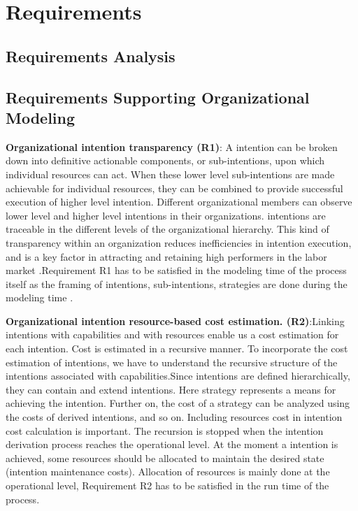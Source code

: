 \chapter{Requirements}
\label{chap:requirements}

\section{Requirements Analysis}


\section{Requirements Supporting Organizational Modeling}

\hspace{4ex} \textbf{Organizational intention transparency (R1)}:  A intention can be broken down into definitive actionable components, or sub-intentions, upon which individual resources can act. When these lower level sub-intentions are made  achievable for individual resources, they can be combined to provide successful execution of higher level intention. Different organizational members can observe lower level and higher level intentions in their organizations. intentions are traceable in the different levels of the organizational hierarchy. This kind of transparency within an organization reduces inefficiencies in intention execution, and is a key factor in attracting and retaining high  performers in the labor market \cite{McManus2007}.Requirement R1 has to be satisfied in the modeling time of the process itself as the framing of intentions, sub-intentions, strategies are done during the modeling time .

\hspace{4ex} \textbf{Organizational intention resource-based cost estimation. (R2)}:Linking intentions with capabilities and with resources enable us a cost estimation for each intention. Cost is estimated in a recursive manner. To incorporate the cost estimation of intentions, we have to understand the recursive structure of the intentions associated with capabilities.Since intentions are defined hierarchically, they can contain and extend intentions. Here strategy represents a means for achieving the intention. Further on, the cost of a strategy can be analyzed using the costs of derived  intentions, and so on. Including resources cost in intention cost calculation is important. The recursion is stopped when the intention derivation process reaches the operational
level. At the moment a  intention is achieved, some resources should be allocated to maintain the desired state (intention maintenance costs)\cite{Mandic2010}. Allocation of resources is mainly done at the operational level, Requirement R2 has to be satisfied in the run time of the process.

